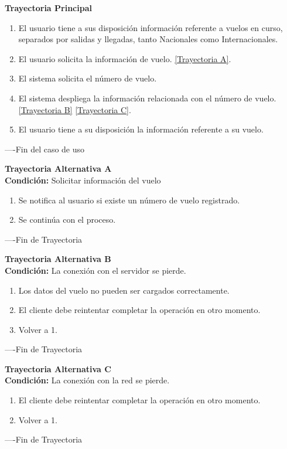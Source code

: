 \begin{flushleft}
	\textbf{Trayectoria Principal}\\
	\begin{enumerate}
		\item El usuario tiene a sus disposición información referente a vuelos en curso, separados por salidas y llegadas, tanto Nacionales 
		como Internacionales.
		\item El usuario solicita la información de vuelo. \hyperlink{TrayectoriaA_CU-U-10}{[Trayectoria A]}.
		\item El sistema solicita el número de vuelo.
		\item El sistema despliega la información relacionada con el número de vuelo. \hyperlink{TrayectoriaB_CU-U-10}{[Trayectoria B]} \hyperlink{TrayectoriaC_CU-U-10}{[Trayectoria C]}.
		\item El usuario tiene a su disposición la información referente a su vuelo.
	\end{enumerate}
\end{flushleft}
----Fin del caso de uso

\begin{flushleft}
	\hypertarget{TrayectoriaA_CU-U-10}{}
	\textbf{Trayectoria Alternativa A}\\
	\textbf{Condición:} Solicitar información del vuelo \\
	\begin{enumerate}
		\item Se notifica al usuario si existe un número de vuelo registrado.
		\item Se continúa con el proceso.
	\end{enumerate}
\end{flushleft}
----Fin de Trayectoria

\begin{flushleft}
	\hypertarget{TrayectoriaB_CU-U-10}{}
	\textbf{Trayectoria Alternativa B}\\
	\textbf{Condición:} La conexión con el servidor se pierde. \\
	\begin{enumerate}
		\item Los datos del vuelo no pueden ser cargados correctamente. 
		\item El cliente debe reintentar completar la operación en otro momento. 
		\item Volver a 1.
	\end{enumerate}
\end{flushleft}
----Fin de Trayectoria

\begin{flushleft}
	\hypertarget{TrayectoriaC_CU-U-10}{}
	\textbf{Trayectoria Alternativa C}\\
	\textbf{Condición:} La conexión con la red se pierde. \\
	\begin{enumerate}
		\item El cliente debe reintentar completar la operación en otro momento. 
		\item Volver a 1.
	\end{enumerate}
\end{flushleft}
----Fin de Trayectoria
\newpage